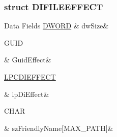 \subsubsection{struct D\-I\-F\-I\-L\-E\-E\-F\-F\-E\-C\-T}
\begin{DoxyFields}{Data Fields}
\hypertarget{a00003_a669c5a85f5a9eb97e64ad880fadaaa2d}{\hyperlink{a00003_a50e15ae51c87ae06ab29c8148cb5f36c}{D\-W\-O\-R\-D}}\label{a00003_a669c5a85f5a9eb97e64ad880fadaaa2d}
&
dw\-Size&
\\
\hline

\hypertarget{a00003_a62607312d96a8c6351fdd1d79d635ae0}{G\-U\-I\-D}\label{a00003_a62607312d96a8c6351fdd1d79d635ae0}
&
Guid\-Effect&
\\
\hline

\hypertarget{a00003_a68e54984c1e1c2be070bc4fd8b41eb35}{\hyperlink{a00003_a7913240b16286bfdcb811a35a982b236}{L\-P\-C\-D\-I\-E\-F\-F\-E\-C\-T}}\label{a00003_a68e54984c1e1c2be070bc4fd8b41eb35}
&
lp\-Di\-Effect&
\\
\hline

\hypertarget{a00003_aeffa4fb29494d7afc9573440dacb0e8c}{C\-H\-A\-R}\label{a00003_aeffa4fb29494d7afc9573440dacb0e8c}
&
sz\-Friendly\-Name\mbox{[}M\-A\-X\-\_\-\-P\-A\-T\-H\mbox{]}&
\\
\hline

\end{DoxyFields}
\label{db/dab/a00089}
\hypertarget{a00003_db/dab/a00089}{}
